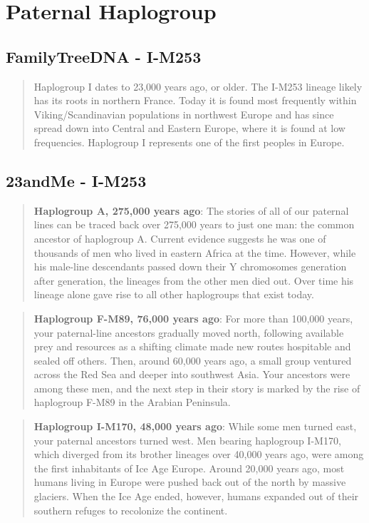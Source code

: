 \documentclass[11pt,letter]{book}
\begin{document}
\section{Paternal Haplogroup}

\subsection{FamilyTreeDNA - I-M253}

\begin{quote}
Haplogroup I dates to 23,000 years ago, or older. The I-M253 lineage likely has its roots in northern France. Today it is found most frequently within Viking/Scandinavian populations in northwest Europe and has since spread down into Central and Eastern Europe, where it is found at low frequencies. Haplogroup I represents one of the first peoples in Europe.\end{quote}

\subsection{23andMe - I-M253}

\begin{quote}
\textbf{Haplogroup A, 275,000 years ago}: The stories of all of our paternal lines can be traced back over 275,000 years to just one man: the common ancestor of haplogroup A. Current evidence suggests he was one of thousands of men who lived in eastern Africa at the time. However, while his male-line descendants passed down their Y chromosomes generation after generation, the lineages from the other men died out. Over time his lineage alone gave rise to all other haplogroups that exist today.
\end{quote}

\begin{quote}
\textbf{Haplogroup F-M89, 76,000 years ago}:  For more than 100,000 years, your paternal-line ancestors gradually moved north, following available prey and resources as a shifting climate made new routes hospitable and sealed off others. Then, around 60,000 years ago, a small group ventured across the Red Sea and deeper into southwest Asia. Your ancestors were among these men, and the next step in their story is marked by the rise of haplogroup F-M89 in the Arabian Peninsula.\end{quote}

\begin{quote}
\textbf{Haplogroup I-M170, 48,000 years ago}:  While some men turned east, your paternal ancestors turned west. Men bearing haplogroup I-M170, which diverged from its brother lineages over 40,000 years ago, were among the first inhabitants of Ice Age Europe. Around 20,000 years ago, most humans living in Europe were pushed back out of the north by massive glaciers. When the Ice Age ended, however, humans expanded out of their southern refuges to recolonize the continent.\end{quote}
\end{document}
